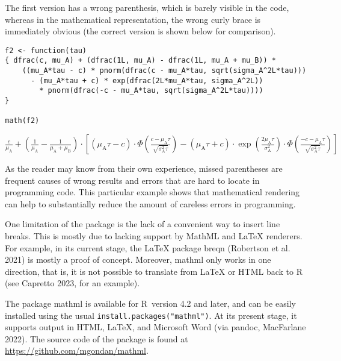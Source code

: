The first version has a wrong parenthesis, which is barely visible in
the code, whereas in the mathematical representation, the wrong curly
brace is immediately obvious (the correct version is shown below for
comparison).

\begin{verbatim}
f2 <- function(tau)
{ dfrac(c, mu_A) + (dfrac(1L, mu_A) - dfrac(1L, mu_A + mu_B)) * 
    ((mu_A*tau - c) * pnorm(dfrac(c - mu_A*tau, sqrt(sigma_A^2L*tau)))
      - (mu_A*tau + c) * exp(dfrac(2L*mu_A*tau, sigma_A^2L))
        * pnorm(dfrac(-c - mu_A*tau, sqrt(sigma_A^2L*tau))))
}

math(f2)
\end{verbatim}

\({\displaystyle{\frac{c}{{\mu}_{\mathrm{A}}}}}{+}{{\left({\displaystyle{\frac{1}{{\mu}_{\mathrm{A}}}}}{-}{\displaystyle{\frac{1}{{{\mu}_{\mathrm{A}}}{+}{{\mu}_{\mathrm{B}}}}}}\right)}{\cdot}{\left[{{\left({{{\mu}_{\mathrm{A}}}{{}}{\tau}}{-}{c}\right)}{\cdot}{\Phi{\left(\displaystyle{\frac{{c}{-}{{{\mu}_{\mathrm{A}}}{{}}{\tau}}}{\sqrt{{{\sigma}_{\mathrm{A}}^{2}}{{}}{\tau}}}}\right)}}}{-}{{{\left({{{\mu}_{\mathrm{A}}}{{}}{\tau}}{+}{c}\right)}{\cdot}{\exp{\left(\displaystyle{\frac{{{2}{{}}{{\mu}_{\mathrm{A}}}}{{}}{\tau}}{{\sigma}_{\mathrm{A}}^{2}}}\right)}}}{\cdot}{\Phi{\left(\displaystyle{\frac{{{-}{c}}{-}{{{\mu}_{\mathrm{A}}}{{}}{\tau}}}{\sqrt{{{\sigma}_{\mathrm{A}}^{2}}{{}}{\tau}}}}\right)}}}\right]}}\)

As the reader may know from their own experience, missed parentheses are
frequent causes of wrong results and errors that are hard to locate in
programming code. This particular example shows that mathematical
rendering can help to substantially reduce the amount of careless errors
in programming.

One limitation of the package is the lack of a convenient way to insert
line breaks. This is mostly due to lacking support by MathML and LaTeX
renderers. For example, in its current stage, the LaTeX package breqn
(Robertson et al. 2021) is mostly a proof of concept. Moreover, mathml
only works in one direction, that is, it is not possible to translate
from LaTeX or HTML back to R (see Capretto 2023, for an example).

The package mathml is available for R~version 4.2 and later, and can be
easily installed using the usual \texttt{install.packages("mathml")}. At its
present stage, it supports output in HTML, LaTeX, and Microsoft Word
(via pandoc, MacFarlane 2022). The source code of the package is found
at \url{https://github.com/mgondan/mathml}.

